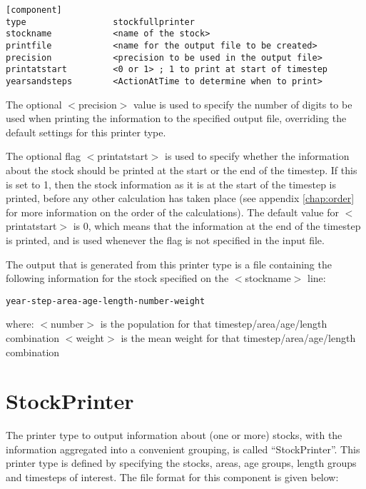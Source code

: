 \documentclass[]{book}
\begin{document}
\begin{verbatim}
[component]
type                 stockfullprinter
stockname            <name of the stock>
printfile            <name for the output file to be created>
precision            <precision to be used in the output file>
printatstart         <0 or 1> ; 1 to print at start of timestep
yearsandsteps        <ActionAtTime to determine when to print>
\end{verbatim}

The optional \(<\)precision\(>\) value is used to specify the number of
digits to be used when printing the information to the specified output
file, overriding the default settings for this printer type.

The optional flag \(<\)printatstart\(>\) is used to specify whether the
information about the stock should be printed at the start or the end of
the timestep. If this is set to 1, then the stock information as it is
at the start of the timestep is printed, before any other calculation
has taken place (see appendix \ref{chap:order} for more information on the order of the
calculations). The default value for \(<\)printatstart\(>\) is 0, which
means that the information at the end of the timestep is printed, and is
used whenever the flag is not specified in the input file.

The output that is generated from this printer type is a file containing
the following information for the stock specified on the \(<\)stockname\(>\)
line:

\begin{verbatim}
year-step-area-age-length-number-weight
\end{verbatim}

where: \(<\)number\(>\) is the population for that timestep/area/age/length
combination \(<\)weight\(>\) is the mean weight for that
timestep/area/age/length combination

\hypertarget{sec:stockprinter}{%
\section{StockPrinter}\label{sec:stockprinter}}

The printer type to output information about (one or more) stocks, with
the information aggregated into a convenient grouping, is called
``StockPrinter''. This printer type is defined by specifying the stocks,
areas, age groups, length groups and timesteps of interest. The file
format for this component is given below:
\end{document}
